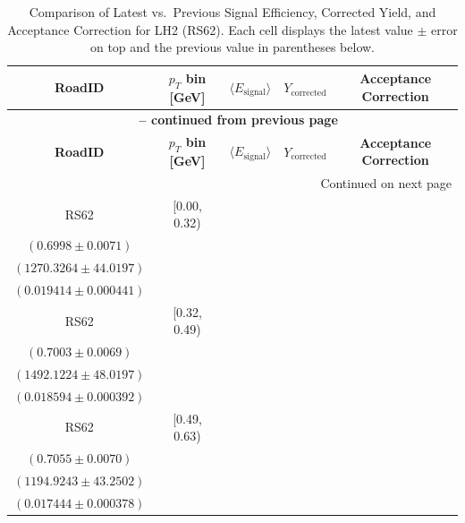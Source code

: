 {\footnotesize
\renewcommand{\arraystretch}{1.35}
\begin{longtable}{|c|c|c|c|c|}
\caption{Comparison of Latest vs.\ Previous Signal Efficiency, Corrected Yield, and Acceptance Correction for LH2 (RS62). Each cell displays the latest value $\pm$ error on top and the previous value in parentheses below.} \label{tab:eff_acc_comp_LH2_RS62} \\
\hline
\textbf{RoadID} & \textbf{$p_{T}$ bin [GeV]} & \textbf{$\langle E_{\mathrm{signal}} \rangle$} & \textbf{$Y_{\mathrm{corrected}}$} & \textbf{Acceptance Correction} \\
\hline
\endfirsthead
\multicolumn{5}{c}{{\bfseries \tablename\ \thetable{} -- continued from previous page}} \\
\hline
\textbf{RoadID} & \textbf{$p_{T}$ bin [GeV]} & \textbf{$\langle E_{\mathrm{signal}} \rangle$} & \textbf{$Y_{\mathrm{corrected}}$} & \textbf{Acceptance Correction} \\
\hline
\endhead
\hline \multicolumn{5}{|r|}{{Continued on next page}} \\ \hline
\endfoot
\hline
\endlastfoot
RS62 & [0.00, 0.32) & \begin{tabular}{@{}c@{}}$0.7185 \pm 0.0082$ \\ $(0.6998 \pm 0.0071)$\end{tabular} & \begin{tabular}{@{}c@{}}$1238.6805 \pm 42.8974$ \\ $(1270.3264 \pm 44.0197)$\end{tabular} & \begin{tabular}{@{}c@{}}$0.017346 \pm 0.000778$ \\ $(0.019414 \pm 0.000441)$\end{tabular} \\ \hline
RS62 & [0.32, 0.49) & \begin{tabular}{@{}c@{}}$0.7214 \pm 0.0083$ \\ $(0.7003 \pm 0.0069)$\end{tabular} & \begin{tabular}{@{}c@{}}$1448.6328 \pm 46.6613$ \\ $(1492.1224 \pm 48.0197)$\end{tabular} & \begin{tabular}{@{}c@{}}$0.016862 \pm 0.000699$ \\ $(0.018594 \pm 0.000392)$\end{tabular} \\ \hline
RS62 & [0.49, 0.63) & \begin{tabular}{@{}c@{}}$0.7178 \pm 0.0084$ \\ $(0.7055 \pm 0.0070)$\end{tabular} & \begin{tabular}{@{}c@{}}$1178.6403 \pm 42.5323$ \\ $(1194.9243 \pm 43.2502)$\end{tabular} & \begin{tabular}{@{}c@{}}$0.016977 \pm 0.000698$ \\ $(0.017444 \pm 0.000378)$\end{tabular} \\ \hline

\end{longtable}}

